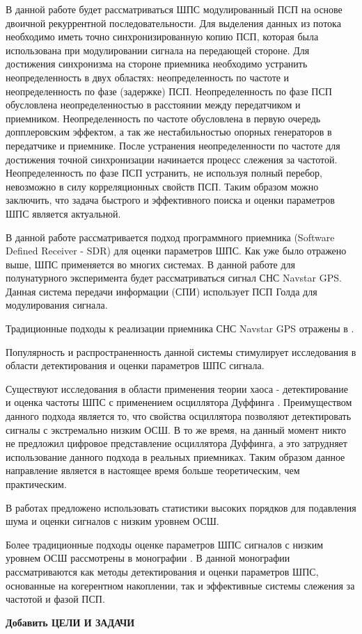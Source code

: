 В данной работе будет рассматриваться ШПС модулированный ПСП на основе двоичной рекуррентной последовательности.
Для выделения данных из потока необходимо иметь точно синхронизированную копию ПСП, которая была использована
при модулировании сигнала на передающей стороне. Для достижения синхронизма на стороне приемника необходимо
устранить неопределенность в двух областях: неопределенность по частоте и неопределенность по фазе (задержке) ПСП.
Неопределенность по фазе ПСП обусловлена неопределенностью в расстоянии между передатчиком и приемником. Неопределенность
по частоте обусловлена в первую очередь допплеровским эффектом, а так же нестабильностью опорных генераторов в
передатчике и приемнике. После устранения неопределенности по частоте для достижения точной синхронизации
начинается процесс слежения за частотой. Неопределенность по фазе ПСП устранить, не используя полный перебор,
невозможно в силу корреляционных свойств ПСП. Таким образом можно заключить, что задача быстрого и эффективного
поиска и оценки параметров ШПС является актуальной.

В данной работе рассматривается подход программного приемника (Software Defined Receiver - SDR)
\cite{akos-book, grayver-book, pany-book} для оценки параметров ШПС. Как уже было отражено выше, ШПС применяется во
многих системах. В данной работе для полунатурного эксперимента будет рассматриваться сигнал СНС Navstar GPS. Данная система передачи 
информации (СПИ) использует ПСП Голда \cite{gold-ieee} для модулирования сигнала.

Традиционные подходы к реализации приемника СНС Navstar GPS отражены в \cite{akos-book, tsui}. 

Популярность и распространенность данной системы стимулирует исследования в области детектирования
и оценки параметров ШПС сигнала.

Существуют исследования в области применения теории хаоса - детектирование и оценка
частоты ШПС с применением осциллятора Дуффинга \cite{chaos_cambridge, chaos_chen, chaos_huang, chaos_wang}. Преимуществом
данного подхода является то, что свойства осциллятора позволяют детектировать сигналы с экстремально низким ОСШ. В то же
время, на данный момент никто не предложил цифровое представление осциллятора Дуффинга, а это затрудняет использование данного подхода
в реальных приемниках. Таким образом данное направление является в настоящее время больше теоретическим, чем практическим.

В работах \cite{hos_petropulu, hos_zhao} предложено использовать статистики высоких порядков для подавления шума и оценки
сигналов с низким уровнем ОСШ.

Более традиционные подходы оценке параметров ШПС сигналов с низким уровнем ОСШ рассмотрены в монографии \cite{ziedan-book}.
В данной монографии рассматриваются как методы детектирования и оценки параметров ШПС, основанные на когерентном накоплении, так и эффективные
системы слежения за частотой и фазой ПСП.

{\bf{Добавить ЦЕЛИ И ЗАДАЧИ}}

\newpage
